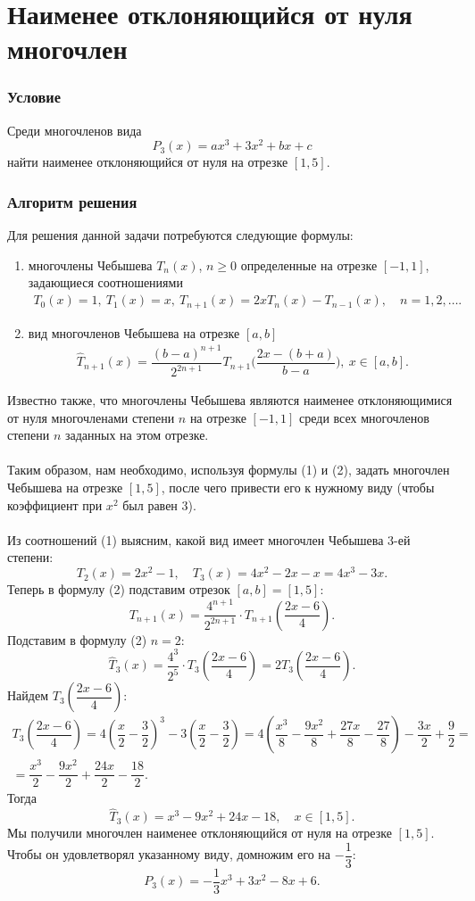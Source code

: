 \documentclass[a4paper, 12pt]{article}
\renewcommand{\geq}{\geqslant}
\begin{document}
	\section*{Наименее отклоняющийся от нуля многочлен}
	\subsubsection*{Условие}
	Среди многочленов вида $$P_3(x) = ax^3 + 3x^2 + bx+c$$ найти наименее отклоняющийся от нуля на отрезке $[1,5]$.
	\subsubsection*{Алгоритм решения}
	Для решения данной задачи потребуются следующие формулы:
	\begin{enumerate}
		\item многочлены Чебышева $T_n(x)$, $n\geq 0$ определенные на отрезке $[-1,1]$, задающиеся соотношениями 
		\begin{eqnarray}
			T_0(x)=1,\ T_1(x) = x,\ T_{n+1}(x) = 2xT_n(x) - T_{n-1}(x),\quad n=1,2,\ldots.
		\end{eqnarray}
		\item вид многочленов Чебышева на отрезке $[a,b]$ 
		\begin{eqnarray}
			\hat T_{n+1}(x) = \dfrac{(b-a)^{n+1}}{2^{2n+1}} T_{n+1}\Big(\dfrac{2x - (b+a)}{b-a}\Big),\ x\in [a,b].
		\end{eqnarray}
	\end{enumerate}
	Известно также, что многочлены Чебышева являются наименее отклоняющимися от нуля многочленами степени $n$ на отрезке $[-1,1]$ среди всех многочленов степени $n$ заданных на этом отрезке.\\\\
	Таким образом, нам необходимо, используя формулы (1) и (2), задать многочлен Чебышева на отрезке $[1,5]$, после чего привести его к нужному виду (чтобы коэффициент при $x^2$ был равен 3).\\\\
	Из соотношений (1) выясним, какой вид имеет многочлен Чебышева 3-ей степени:
	$$T_2(x) = 2x^2 - 1,\quad T_3(x) = 4x^2 - 2x - x = 4x^3 - 3x.$$
	Теперь в формулу (2) подставим отрезок $[a,b] = [1,5]$:
	$$T_{n+1}(x) = \dfrac{4^{n+1}}{2^{2n + 1}}\cdot T_{n+1}\left(\dfrac{2x - 6}{4}\right).$$
	Подставим в формулу (2) $n=2$:
	$$\hat T_{3}(x) = \dfrac{4^{3}}{2^{5}}\cdot T_{3}\left(\dfrac{2x - 6}{4}\right)=2T_{3}\left(\dfrac{2x - 6}{4}\right).$$
	Найдем $T_{3}\left(\dfrac{2x - 6}{4}\right)$:
	\begin{multline*}
		T_{3}\left(\dfrac{2x - 6}{4}\right) = 4\left(\dfrac{x}{2} - \dfrac{3}{2}\right)^3 - 3\left(\dfrac{x}{2} - \dfrac{3}{2}\right) = 4\left(\dfrac{x^3}{8} - \dfrac{9x^2}{8} + \dfrac{27x}{8}-\dfrac{27}{8}\right) - \dfrac{3x}{2} + \dfrac{9}{2} =\\ = \dfrac{x^3}{2} - \dfrac{9x^2}{2} + \dfrac{24x}{2} - \dfrac{18}{2}.
	\end{multline*}
	Тогда $$\hat T_3(x) = x^3 - 9x^2 + 24x - 18,\quad x\in [1,5].$$
	Мы получили многочлен наименее отклоняющийся от нуля на отрезке $[1,5]$. Чтобы он удовлетворял указанному виду, домножим его на $-\dfrac13$:
	$$P_3(x) = -\dfrac13 x^3 + 3x^2 - 8x + 6.$$
\end{document}
